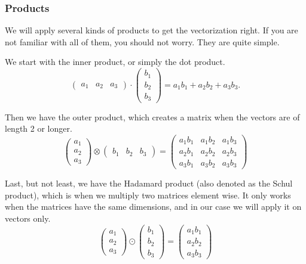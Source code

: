 \documentclass[norsk,a4paper,12pt]{article}
\begin{document}
\subsubsection{Products}
We will apply several kinds of products to get the vectorization right. If you are not familiar with all of them, you should not worry. They are quite simple.

We start with the inner product, or simply the dot product. 
\begin{equation}
\begin{pmatrix}
a_1&a_2&a_3
\end{pmatrix}
\cdot
\begin{pmatrix}
b_1\\b_2\\b_3
\end{pmatrix}
= a_1b_1 + a_2b_2 + a_3b_3.
\end{equation}

Then we have the outer product, which creates a matrix when the vectors are of length 2 or longer. 
\begin{equation}
\begin{pmatrix}
a_1\\a_2\\a_3
\end{pmatrix}
\otimes
\begin{pmatrix}
b_1&b_2&b_3
\end{pmatrix}
= 
\begin{pmatrix}
a_1b_1 & a_1b_2 & a_1b_3\\
a_2b_1 & a_2b_2 & a_2b_3\\
a_3b_1 & a_3b_2 & a_3b_3
\end{pmatrix}
\end{equation}

Last, but not least, we have the Hadamard product (also denoted as the Schul product), which is when we multiply two matrices element wise. It only works when the matrices have the same dimensions, and in our case we will apply it on vectors only. 
\begin{equation}
\begin{pmatrix}
a_1\\a_2\\a_3
\end{pmatrix}
\odot
\begin{pmatrix}
b_1\\b_2\\b_3
\end{pmatrix}
=
\begin{pmatrix}
a_1b_1\\a_2b_2\\a_3b_3
\end{pmatrix}
\end{equation}
\end{document}
